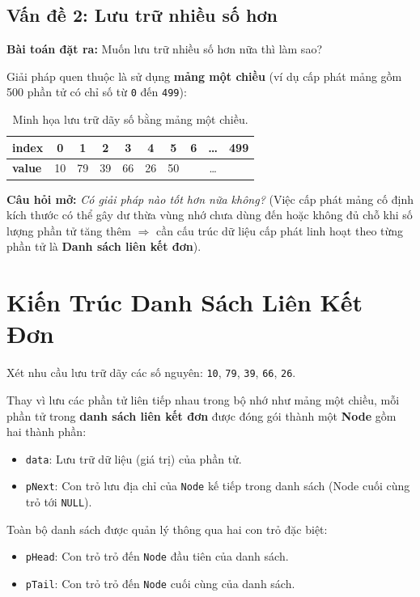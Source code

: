 \documentclass[12pt,a4paper]{article}
\begin{document}
\subsection{Vấn đề 2: Lưu trữ nhiều số hơn}
\textbf{Bài toán đặt ra:} Muốn lưu trữ nhiều số hơn nữa thì làm sao?

\noindent Giải pháp quen thuộc là sử dụng \textbf{mảng một chiều} (ví dụ cấp phát mảng gồm 500 phần tử có chỉ số từ \texttt{0} đến \texttt{499}):

\begin{table}[H]
\centering
\renewcommand{\arraystretch}{1.25}
\begin{tabular}{|>{\bfseries}l|c|c|c|c|c|c|c|c|c|}
\hline
\textbf{index} & 0 & 1 & 2 & 3 & 4 & 5 & 6 & \dots & 499 \\
\hline
\textbf{value} & 10 & 79 & 39 & 66 & 26 & 50 &  & \dots &  \\
\hline
\end{tabular}
\caption{Minh họa lưu trữ dãy số bằng mảng một chiều.}
\end{table}

\noindent\textbf{Câu hỏi mở:} \textit{Có giải pháp nào tốt hơn nữa không?} (Việc cấp phát mảng cố định kích thước có thể gây dư thừa vùng nhớ chưa dùng đến hoặc không đủ chỗ khi số lượng phần tử tăng thêm $\Rightarrow$ cần cấu trúc dữ liệu cấp phát linh hoạt theo từng phần tử là \textbf{Danh sách liên kết đơn}).

\section{Kiến Trúc Danh Sách Liên Kết Đơn}

Xét nhu cầu lưu trữ dãy các số nguyên: \texttt{10}, \texttt{79}, \texttt{39}, \texttt{66}, \texttt{26}.

Thay vì lưu các phần tử liên tiếp nhau trong bộ nhớ như mảng một chiều, mỗi phần tử trong \textbf{danh sách liên kết đơn} được đóng gói thành một \textbf{Node} gồm hai thành phần:
\begin{itemize}[itemsep=0.15em]
    \item \texttt{data}: Lưu trữ dữ liệu (giá trị) của phần tử.
    \item \texttt{pNext}: Con trỏ lưu địa chỉ của \texttt{Node} kế tiếp trong danh sách (Node cuối cùng trỏ tới \texttt{NULL}).
\end{itemize}
Toàn bộ danh sách được quản lý thông qua hai con trỏ đặc biệt:
\begin{itemize}[itemsep=0.15em]
    \item \texttt{pHead}: Con trỏ trỏ đến \texttt{Node} đầu tiên của danh sách.
    \item \texttt{pTail}: Con trỏ trỏ đến \texttt{Node} cuối cùng của danh sách.
\end{itemize}
\end{document}
